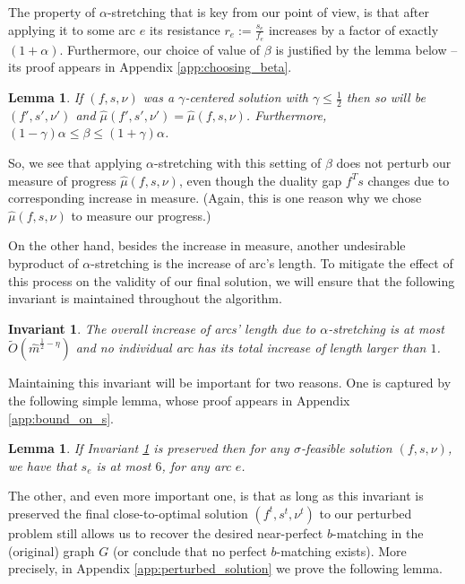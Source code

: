 \documentclass[11pt, letterpaper]{article}
\newtheorem{lemma}[theorem]{Lemma}
\newtheorem{invariant}[theorem]{Invariant}
\newcommand{\tO}[1]{\widetilde{O}(#1)}
\newcommand{\hm}{\widehat{m}}
\newcommand{\hmu}{\hat{\mu}}
\newcommand{\vnu}{\boldsymbol{\mathit{\nu}}}
\newcommand{\vsigma}{\boldsymbol{\mathit{\sigma}}}
\newcommand{\bb}{\boldsymbol{\mathit{b}}}
\newcommand{\ff}{\boldsymbol{\mathit{f}}}
\renewcommand{\ss}{\boldsymbol{\mathit{s}}}
\begin{document}
The property of  $\alpha$-stretching that is key from our point of view, is that after applying it to some arc $e$ its resistance $r_e:=\frac{s_e}{f_e}$ increases by a factor of exactly $(1+\alpha)$. Furthermore, our choice of value of $\beta$ is justified by the lemma below -- its proof appears in Appendix \ref{app:choosing_beta}.

\begin{lemma}
\label{lem:choosing_beta}
If $(\ff,\ss,\vnu)$ was a $\gamma$-centered solution with $\gamma\leq \frac{1}{2}$ then so will be $(\ff',\ss',\vnu')$ and $\hmu(\ff',\ss',\vnu')= \hmu(\ff,\ss,\vnu)$. Furthermore, $(1-\gamma)\alpha \leq \beta \leq (1+\gamma)\alpha$.
\end{lemma}

So, we see that applying $\alpha$-stretching with this setting of $\beta$ does not perturb our measure of progress $\hmu(\ff,\ss,\vnu)$, even though the duality gap $\ff^T\ss$ changes due to corresponding increase in measure. (Again, this is one reason why we chose $\hmu(\ff,\ss,\vnu)$ to measure our progress.)

On the other hand, besides the increase in measure, another undesirable byproduct of $\alpha$-stretching is the increase of arc's length. To mitigate the effect of this process on the validity of our final solution, we will ensure that the following invariant is maintained throughout the algorithm.

\begin{invariant}
\label{inv:length_upper}
The overall increase of arcs' length due to $\alpha$-stretching is at most $\tO{\hm^{\frac{1}{2}-\eta}}$ and no individual arc has its total increase of length larger than $1$.
\end{invariant} 

\noindent Maintaining this invariant will be important for two reasons. One is captured by the following simple lemma, whose proof appears in Appendix \ref{app:bound_on_s}.

\begin{lemma}
\label{lem:bound_on_s}
If Invariant \ref{inv:length_upper} is preserved then for any $\vsigma$-feasible solution $(\ff,\ss,\vnu)$, we have that $s_{e}$ is at most $6$, for any arc $e$.
\end{lemma}

The other, and even more important one, is that as long as this invariant is preserved the final close-to-optimal solution $(\ff^t,\ss^t,\vnu^t)$ to our perturbed problem still allows us to recover the desired near-perfect $\bb$-matching in the (original) graph $G$ (or conclude that no perfect $\bb$-matching exists). More precisely, in Appendix \ref{app:perturbed_solution} we prove the following lemma.
\end{document}
